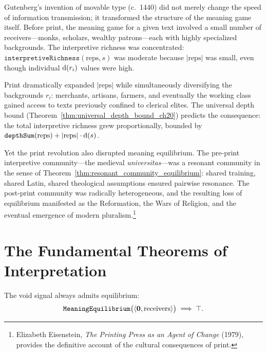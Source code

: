 \begin{example}
\label{ex:printing_press}
Gutenberg's invention of movable type (c.\ 1440) did not merely change the
speed of information transmission; it transformed the structure of the
meaning game itself.  Before print, the meaning game for a given text
involved a small number of receivers---monks, scholars, wealthy
patrons---each with highly specialized backgrounds.  The interpretive
richness was concentrated: $\texttt{interpretiveRichness}(\text{reps}, s)$
was moderate because $|\text{reps}|$ was small, even though individual
$\operatorname{d}(r_i)$ values were high.

Print dramatically expanded $|\text{reps}|$ while simultaneously
diversifying the backgrounds $r_i$: merchants, artisans, farmers, and
eventually the working class gained access to texts previously confined
to clerical elites.  The universal depth bound
(Theorem~\ref{thm:universal_depth_bound_ch20}) predicts the consequence:
the total interpretive richness grew proportionally, bounded by
$\texttt{depthSum}(\text{reps}) + |\text{reps}| \cdot \operatorname{d}(s)$.

Yet the print revolution also disrupted meaning equilibrium.  The
pre-print interpretive community---the medieval \textit{universitas}---was
a resonant community in the sense of
Theorem~\ref{thm:resonant_community_equilibrium}: shared training, shared
Latin, shared theological assumptions ensured pairwise resonance.  The
post-print community was radically heterogeneous, and the resulting loss
of equilibrium manifested as the Reformation, the Wars of Religion, and
the eventual emergence of modern pluralism.\footnote{Elizabeth Eisenstein,
\textit{The Printing Press as an Agent of Change} (1979), provides the
definitive account of the cultural consequences of print.}
\end{example}

\section{The Fundamental Theorems of Interpretation}
\label{sec:ch20-fundamental}

\begin{theorem}
\label{thm:fundamental_void_equilibrium}
The void signal always admits equilibrium:
\[
  \texttt{MeaningEquilibrium}\bigl(\langle \mathbf{0}, \text{receivers} \rangle\bigr)
  \implies \top.
\]
\end{theorem}

